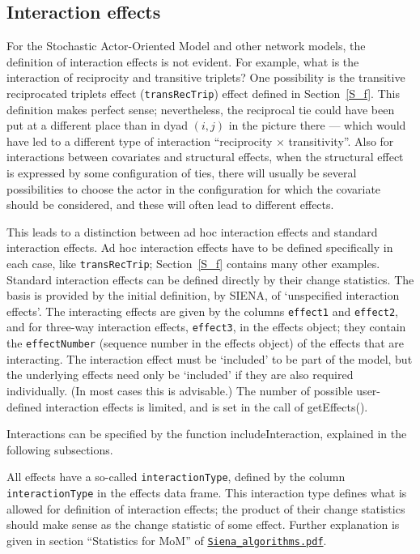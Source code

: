 \documentclass[a4paper,fleqn,11pt]{article}
\newcommand{\+}{\, + \,}
\newcommand{\sfn}[1]{\textsf{#1}}
\newcommand{\si}{{\sf SIENA}}
\newcommand{\SAOM}{{Stochastic Actor-Oriented Model }}
\begin{document}
\hypertarget{T_int_eff}{
\subsection{Interaction effects}
}
\label{S_int_eff}

For the \SAOM and other network models, the definition of interaction
effects is not evident. For example, what is the interaction of
reciprocity and transitive triplets? One possibility is the
transitive reciprocated triplets effect (\texttt{transRecTrip})
effect defined in Section~\ref{S_f}.
This definition makes perfect sense; nevertheless, the reciprocal tie could
have been put at a different place than in dyad $(i,j)$
in the picture there --- which would have led
to a different type of interaction ``reciprocity $\times$ transitivity''.
Also for interactions between covariates and structural effects,
when the structural effect is expressed by some configuration of ties,
there will usually be several possibilities to choose the actor in the
configuration for which the covariate should be considered, and these will
often lead to different effects.

This leads to a distinction between ad hoc interaction effects and standard
interaction effects.
Ad hoc interaction effects have to be defined specifically in each case,
like \texttt{transRecTrip}; Section~\ref{S_f} contains many other examples.
Standard interaction effects can be defined directly by their change statistics.
The basis is provided by the initial definition, by \si, of `unspecified
interaction effects'.
The interacting effects are given by
the columns \texttt{effect1} and \texttt{effect2},
and for three-way interaction effects, \texttt{effect3},
in the effects object; they contain the \texttt{effectNumber}
(sequence number in the effects object) of the effects that are interacting.
The interaction effect must be `included' to be part of the model,
but the underlying effects need only be `included' if
they are also required individually.
(In most cases this is advisable.)
The number of possible user-defined interaction effects is limited,
and is set in the call of \sfn{getEffects()}.

Interactions can be specified by the function \sfn{includeInteraction},
explained in the following subsections.

All effects have a so-called  \texttt{interactionType},
defined by the column \texttt{interactionType} in the effects data frame.
This interaction type defines what is allowed for  definition of interaction effects;
the product of their change statistics should make sense as the change
statistic of some effect.
Further explanation is given in section ``Statistics for MoM'' of
\href{http://www.stats.ox.ac.uk/~snijders/siena/Siena_algorithms.pdf}{\texttt{Siena\_algorithms.pdf}}.
\end{document}

